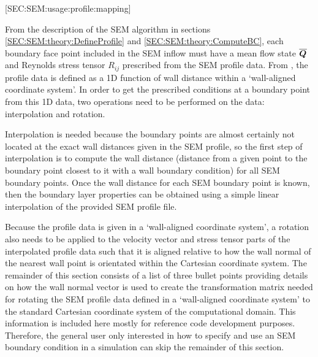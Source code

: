 \begin{itemize}
\end{itemize}


%
[SEC:SEM:usage:profile:mapping]

From the description of the SEM algorithm in sections
\ref{SEC:SEM:theory:DefineProfile} and \ref{SEC:SEM:theory:ComputeBC}, each
boundary face point included in the SEM inflow must have a mean flow state
\(\overline{\cvVec}\) and Reynolds stress tensor $R_{ij}$ prescribed from the
SEM profile data.
%
From , the profile data is defined as a 1D
function of wall distance within a `wall-aligned coordinate system'.
%
In order to get the prescribed conditions at a boundary point from this 1D data,
two operations need to be performed on the data: interpolation and rotation.


Interpolation is needed because the boundary points are almost certainly not
located at the exact wall distances given in the SEM profile, so the first step
of interpolation is to compute the wall distance (\thatis distance from a given
point to the boundary point closest to it with a wall boundary condition) for
all SEM boundary points.
%
Once the wall distance for each SEM boundary point is known,
then the boundary layer properties can be obtained using a simple linear
interpolation of the provided SEM profile file.


Because the profile data is given in a `wall-aligned coordinate system', a
rotation also needs to be applied to the velocity vector and stress tensor
parts of the
interpolated profile data such that it is aligned relative to how the wall
normal of the nearest wall point is orientated within the Cartesian coordinate
system.
%
The remainder of this section consists of a list of three bullet points
providing details on how the wall normal vector is used to create the
transformation matrix needed for rotating the SEM profile data defined in a
`wall-aligned coordinate system' to the standard Cartesian coordinate system of
the computational domain.
%
This information is included here mostly for reference \andor code development
purposes.
%
Therefore, the general user only interested in how to specify and use an
SEM boundary condition in a simulation can skip the remainder of this section.

